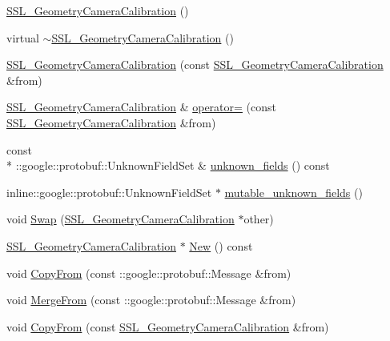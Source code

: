 \begin{DoxyCompactItemize}
\item 
\hyperlink{class_s_s_l___geometry_camera_calibration_a1aedd213456e61cddcf4b6e0184fe083}{S\-S\-L\-\_\-\-Geometry\-Camera\-Calibration} ()
\item 
virtual \hyperlink{class_s_s_l___geometry_camera_calibration_a52e6a900c55170b2fa59b2d156d96b9c}{$\sim$\-S\-S\-L\-\_\-\-Geometry\-Camera\-Calibration} ()
\item 
\hyperlink{class_s_s_l___geometry_camera_calibration_ad7a555588ba5c1e7f5e655590bd7a113}{S\-S\-L\-\_\-\-Geometry\-Camera\-Calibration} (const \hyperlink{class_s_s_l___geometry_camera_calibration}{S\-S\-L\-\_\-\-Geometry\-Camera\-Calibration} \&from)
\item 
\hyperlink{class_s_s_l___geometry_camera_calibration}{S\-S\-L\-\_\-\-Geometry\-Camera\-Calibration} \& \hyperlink{class_s_s_l___geometry_camera_calibration_a0df915a1f6dab9ce129e05c533380e35}{operator=} (const \hyperlink{class_s_s_l___geometry_camera_calibration}{S\-S\-L\-\_\-\-Geometry\-Camera\-Calibration} \&from)
\item 
const \\*
\-::google\-::protobuf\-::\-Unknown\-Field\-Set \& \hyperlink{class_s_s_l___geometry_camera_calibration_a88ca7c8868055631a5d9ddfa5455b408}{unknown\-\_\-fields} () const 
\item 
inline\-::google\-::protobuf\-::\-Unknown\-Field\-Set $\ast$ \hyperlink{class_s_s_l___geometry_camera_calibration_a0e957e6326e792dd06baba2197fb6ea2}{mutable\-\_\-unknown\-\_\-fields} ()
\item 
void \hyperlink{class_s_s_l___geometry_camera_calibration_ace353fcbe6441c75440f4a7561fe9dfa}{Swap} (\hyperlink{class_s_s_l___geometry_camera_calibration}{S\-S\-L\-\_\-\-Geometry\-Camera\-Calibration} $\ast$other)
\item 
\hyperlink{class_s_s_l___geometry_camera_calibration}{S\-S\-L\-\_\-\-Geometry\-Camera\-Calibration} $\ast$ \hyperlink{class_s_s_l___geometry_camera_calibration_a15132952597c71abb7c9a70d31ac16ba}{New} () const 
\item 
void \hyperlink{class_s_s_l___geometry_camera_calibration_ac034f04d70115d82a697ef31437fa688}{Copy\-From} (const \-::google\-::protobuf\-::\-Message \&from)
\item 
void \hyperlink{class_s_s_l___geometry_camera_calibration_a0518b6487c08d89920b43f0002bb8d49}{Merge\-From} (const \-::google\-::protobuf\-::\-Message \&from)
\item 
void \hyperlink{class_s_s_l___geometry_camera_calibration_a6ff44bce72ed34846cc1b0d396c0d3b7}{Copy\-From} (const \hyperlink{class_s_s_l___geometry_camera_calibration}{S\-S\-L\-\_\-\-Geometry\-Camera\-Calibration} \&from)

\end{DoxyCompactItemize}
